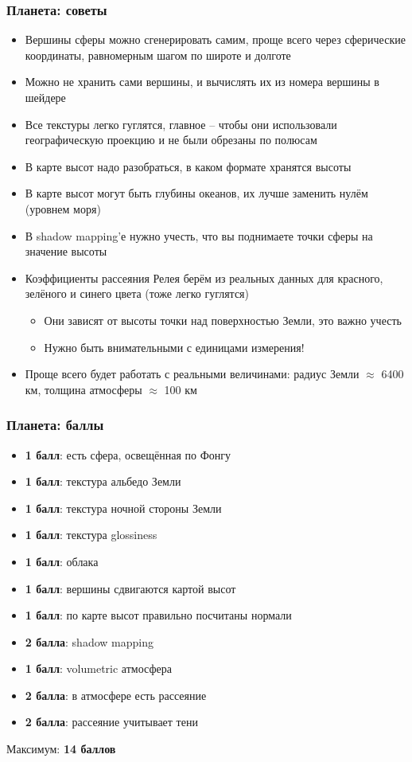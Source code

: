 \documentclass{beamer}
\begin{document}
\begin{frame}[fragile]
\frametitle{Планета: советы}
\fontsize{8pt}{8pt}
\selectfont
\begin{itemize}
\item Вершины сферы можно сгенерировать самим, проще всего через сферические координаты, равномерным шагом по широте и долготе
\item Можно не хранить сами вершины, и вычислять их из номера вершины в шейдере
\item Все текстуры легко гуглятся, главное -- чтобы они использовали географическую проекцию и не были обрезаны по полюсам
\item В карте высот надо разобраться, в каком формате хранятся высоты
\item В карте высот могут быть глубины океанов, их лучше заменить нулём (уровнем моря)
\item В shadow mapping'е нужно учесть, что вы поднимаете точки сферы на значение высоты
\item Коэффициенты рассеяния Релея берём из реальных данных для красного, зелёного и синего цвета (тоже легко гуглятся)
\begin{itemize}
\fontsize{8pt}{8pt}
\selectfont
\item Они зависят от высоты точки над поверхностью Земли, это важно учесть
\item Нужно быть внимательными с единицами измерения!
\end{itemize}
\item Проще всего будет работать с реальными величинами: радиус Земли \begin{math}\approx\end{math} 6400 км, толщина атмосферы \begin{math}\approx\end{math} 100 км
\end{itemize}
\end{frame}

\begin{frame}[fragile]
\frametitle{Планета: баллы}
\fontsize{8pt}{8pt}
\selectfont
\begin{itemize}
\item \textbf{1 балл}: есть сфера, освещённая по Фонгу
\item \textbf{1 балл}: текстура альбедо Земли
\item \textbf{1 балл}: текстура ночной стороны Земли
\item \textbf{1 балл}: текстура glossiness
\item \textbf{1 балл}: облака
\item \textbf{1 балл}: вершины сдвигаются картой высот
\item \textbf{1 балл}: по карте высот правильно посчитаны нормали
\item \textbf{2 балла}: shadow mapping
\item \textbf{1 балл}: volumetric атмосфера
\item \textbf{2 балла}: в атмосфере есть рассеяние
\item \textbf{2 балла}: рассеяние учитывает тени
\end{itemize}
Максимум: \textbf{14 баллов}
\end{frame}
\end{document}
